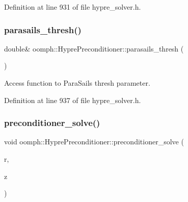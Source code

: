 Definition at line 931 of file hypre\+\_\+solver.\+h.

\mbox{\label{classoomph_1_1HyprePreconditioner_a26a87703b9b18194ef57ad1f0ffed5bf}} 
\subsubsection{\texorpdfstring{parasails\+\_\+thresh()}{parasails\_thresh()}}
{\footnotesize\ttfamily double\& oomph\+::\+Hypre\+Preconditioner\+::parasails\+\_\+thresh (\begin{DoxyParamCaption}{ }\end{DoxyParamCaption})\hspace{0.3cm}{\ttfamily [inline]}}



Access function to Para\+Sails thresh parameter. 



Definition at line 937 of file hypre\+\_\+solver.\+h.

\mbox{\label{classoomph_1_1HyprePreconditioner_ad4967b01386d24d1839bccb99b2f9560}} 
\subsubsection{\texorpdfstring{preconditioner\+\_\+solve()}{preconditioner\_solve()}}
{\footnotesize\ttfamily void oomph\+::\+Hypre\+Preconditioner\+::preconditioner\+\_\+solve (\begin{DoxyParamCaption}\item[{const \hyperlink{classoomph_1_1DoubleVector}{Double\+Vector} \&}]{r,  }\item[{\hyperlink{classoomph_1_1DoubleVector}{Double\+Vector} \&}]{z }\end{DoxyParamCaption})\hspace{0.3cm}{\ttfamily [virtual]}}



